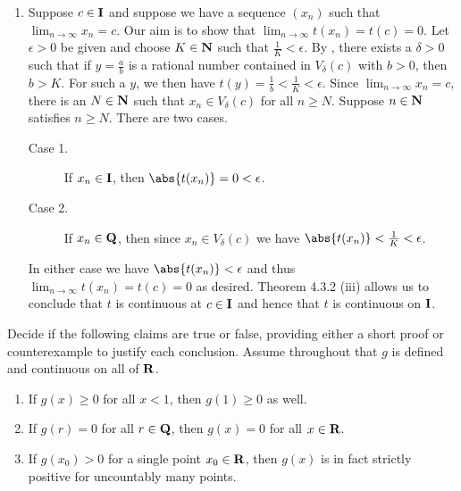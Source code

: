 \documentclass{lew98_solutions}
\begin{document}
\begin{solution}
\begin{enumerate}
        \item Suppose \( c \in \mathbf{I} \) and suppose we have a sequence \( (x_n) \) such that \( \lim_{n \to \infty} x_n = c \). Our aim is to show that \( \lim_{n \to \infty} t(x_n) = t(c) = 0 \). Let \( \epsilon > 0 \) be given and choose \( K \in \mathbf{N} \) such that \( \tfrac{1}{K} < \epsilon \). By , there exists a \( \delta > 0 \) such that if \( y = \tfrac{a}{b} \) is a rational number contained in \( V_{\delta}(c) \) with \( b > 0 \), then \( b > K \). For such a \( y \), we then have \( t(y) = \tfrac{1}{b} < \tfrac{1}{K} < \epsilon \). Since \( \lim_{n \to \infty} x_n = c \), there is an \( N \in \mathbf{N} \) such that \( x_n \in V_{\delta}(c) \) for all \( n \geq N \). Suppose \( n \in \mathbf{N} \) satisfies \( n \geq N \). There are two cases.
        \begin{description}
            \item[Case 1.] If \( x_n \in \mathbf{I} \), then \( \abs{t(x_n)} = 0 < \epsilon \).
            
            \item[Case 2.] If \( x_n \in \mathbf{Q} \), then since \( x_n \in V_{\delta}(c) \)  we have \( \abs{t(x_n)} < \tfrac{1}{K} < \epsilon \).
        \end{description}
        In either case we have \( \abs{t(x_n)} < \epsilon \) and thus \( \lim_{n \to \infty} t(x_n) = t(c) = 0 \) as desired. Theorem 4.3.2 (iii) allows us to conclude that \( t \) is continuous at \( c \in \mathbf{I} \) and hence that \( t \) is continuous on \( \mathbf{I} \).
    \end{enumerate}
\end{solution}

\begin{exercise}
\label{ex:4.3.8}
    Decide if the following claims are true or false, providing either a short proof or counterexample to justify each conclusion. Assume throughout that \( g \) is defined and continuous on all of \( \mathbf{R} \).
    \begin{enumerate}
        \item If \( g(x) \geq 0 \) for all \( x < 1 \), then \( g(1) \geq 0 \) as well.

        \item If \( g(r) = 0 \) for all \( r \in \mathbf{Q} \), then \( g(x) = 0 \) for all \( x \in \mathbf{R} \).

        \item If \( g(x_0) > 0 \) for a single point \( x_0 \in \mathbf{R} \), then \( g(x) \) is in fact strictly positive for uncountably many points.
    \end{enumerate}
\end{exercise}
\end{document}
